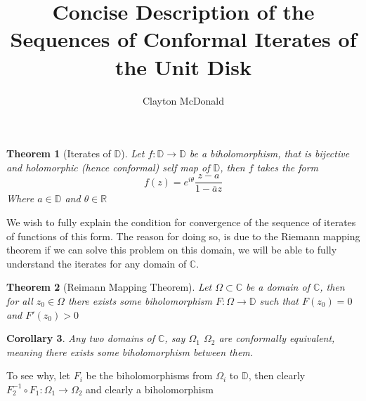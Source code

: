 \documentclass{article}
\title{Concise Description of the Sequences of Conformal Iterates of the Unit Disk}
\author{Clayton McDonald}
\newcommand{\R}{\mathbb{R}}
\newcommand{\C}{\mathbb{C}}
\newcommand{\D}{\mathbb{D}}
\newtheorem{theorem}{Theorem}
\newtheorem{corollary}[theorem]{Corollary}
\begin{document}
\maketitle
\begin{theorem}[Iterates of $\D$]
    Let $f:\D\to\D$ be a biholomorphism, that is bijective and holomorphic (hence conformal) self map of $\D$, then $f$ takes the form
    \begin{equation*}
        f(z) = e^{i\theta} \frac{z-a}{1-\overline{a}z}
    \end{equation*}
Where $a\in\D$ and $\theta\in\R$
\end{theorem}
We wish to fully explain the condition for convergence of the sequence of iterates of functions of this form.
The reason for doing so, is due to the Riemann mapping theorem if we can solve this problem on this domain, we will be able to fully understand
the iterates for any domain of $\C$. 
\begin{theorem}[Reimann Mapping Theorem]
Let $\Omega\subset\C$ be a domain of $\C$, then for all $z_0\in\Omega$ there exists some biholomorphism $F:\Omega\to\D$ such that $F(z_0) = 0$ and $F'(z_0)>0$
\end{theorem}
\begin{corollary}
    Any two domains of $\C$, say $\Omega_1$ $\Omega_2$ are conformally equivalent, meaning there exists some biholomorphism between them.
\end{corollary}
To see why, let $F_i$ be the biholomorphisms from $\Omega_i$ to $\D$, then clearly $F_2^{-1} \circ F_1:\Omega_1\to\Omega_2$ and clearly a biholomorphism
\end{document}
